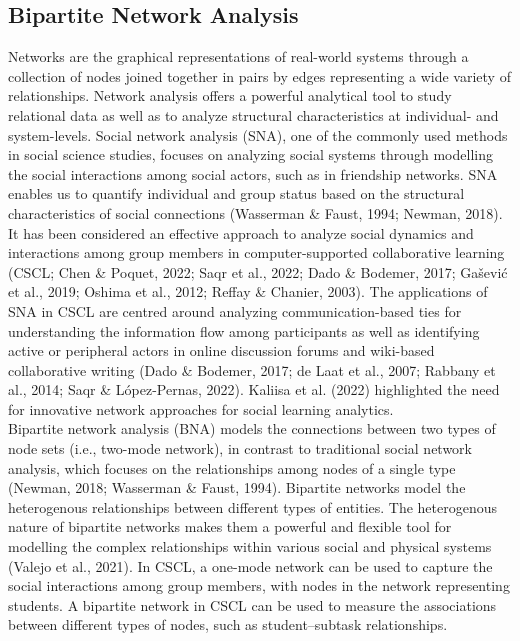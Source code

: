 \subsection{Bipartite Network Analysis}
Networks are the graphical representations of real-world systems through a collection of nodes joined together in pairs by edges representing a wide variety of relationships. Network analysis offers a powerful analytical tool to study relational data as well as to analyze structural characteristics at individual- and system-levels. Social network analysis (SNA), one of the commonly used methods in social science studies, focuses on analyzing social systems through modelling the social interactions among social actors, such as in friendship networks. SNA enables us to quantify individual and group status based on the structural characteristics of social connections (Wasserman \& Faust, 1994; Newman, 2018). It has been considered an effective approach to analyze social dynamics and interactions among group members in computer-supported collaborative learning (CSCL; Chen \& Poquet, 2022; Saqr et al., 2022; Dado \& Bodemer, 2017; Gašević et al., 2019; Oshima et al., 2012; Reffay \& Chanier, 2003). The applications of SNA in CSCL are centred around analyzing communication-based ties for understanding the information flow among participants as well as identifying active or peripheral actors in online discussion forums and wiki-based collaborative writing (Dado \& Bodemer, 2017; de Laat et al., 2007; Rabbany et al., 2014; Saqr \& López-Pernas, 2022). Kaliisa et al. (2022) highlighted the need for innovative network approaches for social learning analytics.\\

Bipartite network analysis (BNA) models the connections between two types of node sets (i.e., two-mode network), in contrast to traditional social network analysis, which focuses on the relationships among nodes of a single type (Newman, 2018; Wasserman \& Faust, 1994). Bipartite networks model the heterogenous relationships between different types of entities. The heterogenous nature of bipartite networks makes them a powerful and flexible tool for modelling the complex relationships within various social and physical systems (Valejo et al., 2021). In CSCL, a one-mode network can be used to capture the social interactions among group members, with nodes in the network representing students. A bipartite network in CSCL can be used to measure the associations between different types of nodes, such as student–subtask relationships.\\


